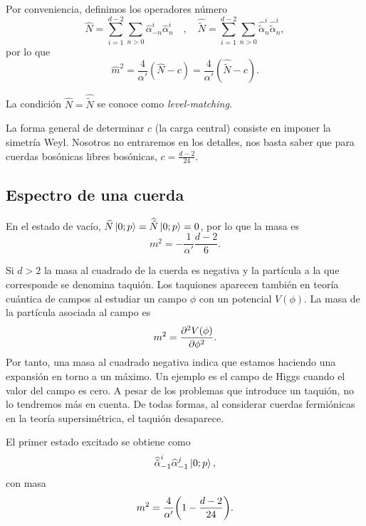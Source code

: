 Por conveniencia, definimos los operadores número
\begin{equation}
  \widehat N=\sum_{i=1}^{d-2} \sum_{n>0}\widehat \alpha_{-n}^i\widehat\alpha_n^i \quad , \quad   
  \widehat {\tilde N}=\sum_{i=1}^{d-2} \sum_{n>0} \widehat{\tilde \alpha}_n^i\widehat{ \tilde\alpha}_n^i, 
\end{equation}
por lo que 
\begin{equation}
  \widehat m^2 = \frac{4}{\alpha'} (\widehat N -c ) = \frac{4}{\alpha'} (\widehat{\tilde N} -c).
  \label{eq:massdef}
\end{equation}

La condición $\widehat N=\widehat {\tilde N}$ se conoce como \emph{level-matching}.

La forma general de determinar $c$ (la carga central) consiste en imponer la simetría Weyl.
Nosotros no entraremos en los detalles, nos basta saber que para cuerdas bosónicas libres
bosónicas, $c=\frac{d-2}{24}$.


\subsection{Espectro de una cuerda}
En el estado de vacío, $\widehat N\ket{0;p}=\widehat {\tilde N}\ket{0;p}=0$, por lo que la masa es
\begin{equation}
  m^2 = -\frac{1}{\alpha'}\frac{d-2}{6}.
\end{equation}

Si $d>2$ la masa al cuadrado de la cuerda es negativa y la partícula a la que corresponde se denomina taquión.
Los taquiones aparecen también en teoría cuántica de campos al estudiar un campo $\phi$ con un 
potencial $V(\phi)$.
La masa de la partícula asociada al campo es
\begin{equation}
  m^2 = \pdv[2]{V(\phi)}{\phi}.
\end{equation}
Por tanto, una masa al cuadrado negativa indica que estamos haciendo una expansión en torno
a un máximo. 
Un ejemplo es el campo de Higgs cuando el valor del campo es cero.
A pesar de los problemas que introduce un taquión, no lo tendremos más en cuenta. 
De todas formas, al considerar cuerdas fermiónicas en la teoría supersimétrica, el taquión
desaparece.

El primer estado excitado se obtiene como
\begin{equation}
  \widehat{\tilde\alpha}_{-1}^i\widehat \alpha_{-1}^j\ket{0;p},
\end{equation}
con masa
\begin{equation}
  m^2 = \frac{4}{\alpha'}\qty(1-\frac{d-2}{24}).
\end{equation}

